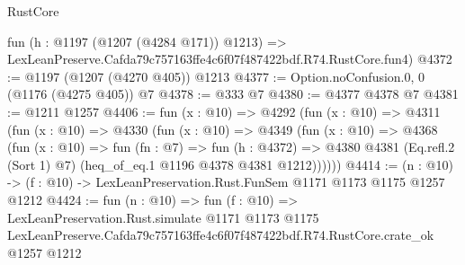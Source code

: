 \begin{lexlean}{RustCore}
\begin{coremodule}
    fun (h : @1197 (@1207 (@4284 @171)) @1213) =>
    LexLeanPreserve.Cafda79c757163ffe4c6f07f487422bdf.R74.RustCore.fun4)
@4372 := @1197 (@1207 (@4270 @405)) @1213
@4377 := Option.noConfusion.{0, 0} (@1176 (@4275 @405)) @7
@4378 := @333 @7
@4380 := @4377 @4378 @7
@4381 := @1211 @1257
@4406 := fun (x : @10) =>
  @4292
    (fun (x : @10) =>
    @4311
      (fun (x : @10) =>
      @4330
        (fun (x : @10) =>
        @4349
          (fun (x : @10) =>
          @4368
            (fun (x : @10) =>
            fun (fn : @7) =>
            fun (h : @4372) =>
            @4380 @4381 (Eq.refl.{2} (Sort 1) @7) (heq_of_eq.{1} @1196 @4378 @4381 @1212))))))
@4414 := (n : @10) -> (f : @10) -> LexLeanPreservation.Rust.FunSem @1171 @1173 @1175 @1257 @1212
@4424 := fun (n : @10) =>
  fun (f : @10) =>
  LexLeanPreservation.Rust.simulate
    @1171
    @1173
    @1175
    LexLeanPreserve.Cafda79c757163ffe4c6f07f487422bdf.R74.RustCore.crate_ok
    @1257
    @1212
\end{coremodule}
\end{lexlean}

